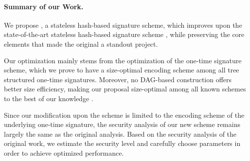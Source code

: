


\paragraph{Summary of our Work.}
We propose \SPHINCSA, a stateless hash-based signature scheme, which improves upon the state-of-the-art stateless hash-based signature scheme \SPHINCSP, while preserving the core elements that made the original \SPHINCSP a standout project. 

Our optimization mainly stems from the optimization of the one-time signature scheme, which we prove to have a size-optimal encoding scheme among all tree structured one-time signatures. Moreover, no DAG-based construction offers better size efficiency, making our proposal size-optimal among all known schemes to the best of our knowledge \cite{optimalwots}.

Since our modification upon the \SPHINCSP scheme is limited to the encoding scheme of the underlying \WOTSP one-time signature, the security analysis of our new scheme remains largely the same as the original analysis.
Based on the security analysis of the original work, we estimate the security level and carefully choose parameters in order to achieve optimized performance.

